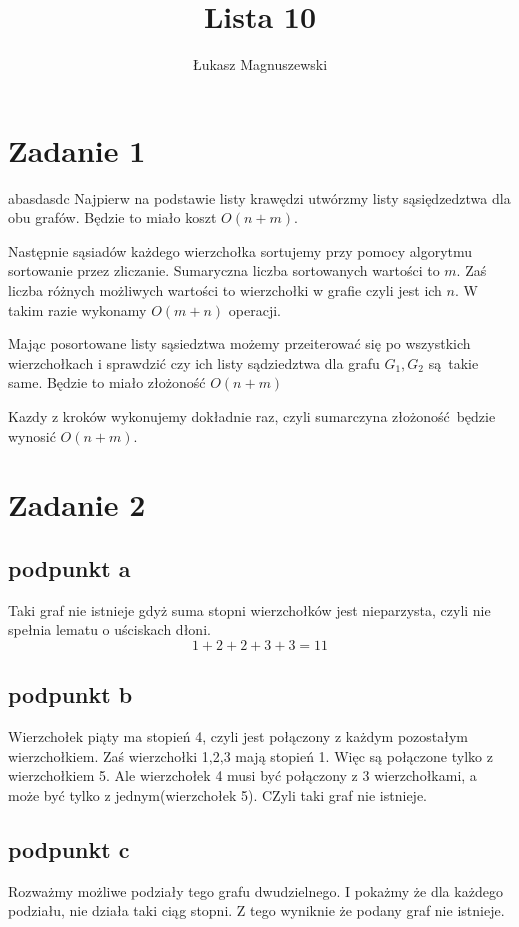 \documentclass{article}
\title{Lista 10}
\author{Łukasz Magnuszewski}
\date{\vspace{-5ex}}
\begin{document}
\maketitle
\section*{Zadanie 1}
abasdasdc
Najpierw na podstawie listy krawędzi utwórzmy listy sąsiędzedztwa dla obu grafów. 
Będzie to miało koszt $O(n+m)$. 

Następnie sąsiadów każdego wierzchołka sortujemy przy pomocy algorytmu sortowanie przez zliczanie. Sumaryczna liczba sortowanych wartości to $m$. Zaś liczba różnych możliwych wartości to wierzchołki w grafie czyli jest ich $n$. W takim razie wykonamy $O(m+n)$ operacji.

Mając posortowane listy sąsiedztwa możemy przeiterować się po wszystkich wierzchołkach i sprawdzić czy ich listy sądziedztwa dla grafu $G_1, G_2$ są takie same. Będzie to miało złożoność $O(n+m)$

Kazdy z kroków wykonujemy dokładnie raz, czyli sumarczyna złożoność będzie wynosić $O(n+m)$.


\section*{Zadanie 2}
\subsection*{podpunkt a}
Taki graf nie istnieje gdyż suma stopni wierzchołków jest nieparzysta, czyli nie spełnia lematu o uściskach dłoni.
\[
  1+2+2+3+3=11
\]


\subsection*{podpunkt b}
Wierzchołek piąty ma stopień 4, czyli jest połączony z każdym pozostałym wierzchołkiem. Zaś wierzchołki 1,2,3 mają stopień 1. Więc są połączone tylko z wierzchołkiem 5. Ale wierzchołek 4 musi być połączony z 3 wierzchołkami, a może być tylko z jednym(wierzchołek 5). CZyli taki graf nie istnieje.

\subsection*{podpunkt c}
Rozważmy możliwe podziały tego grafu dwudzielnego. I pokażmy że dla każdego podziału, nie działa taki ciąg stopni. Z tego wyniknie że podany graf nie istnieje.
\end{document}
